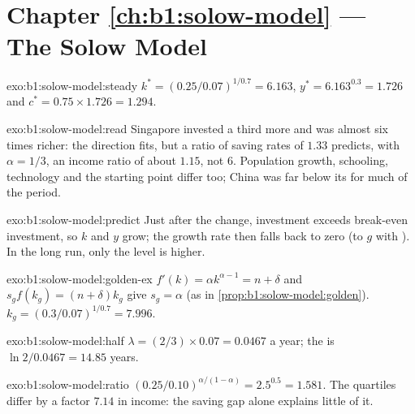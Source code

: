 \section*{Chapter \ref{ch:b1:solow-model} --- The Solow Model}

\begin{solution}{exo:b1:solow-model:steady}
$k^* = (0.25/0.07)^{1/0.7} = 6.163$, $y^* = 6.163^{0.3} = 1.726$ and $c^* = 0.75 \times 1.726 = 1.294$.
\end{solution}

\begin{solution}{exo:b1:solow-model:read}
Singapore invested a third more and was almost six times richer: the
direction fits, but a ratio of saving rates of $1.33$ predicts, with $\alpha = 1/3$, an
income ratio of about $1.15$, not 6. Population growth, schooling, technology
and the starting point differ too; China was far below its 
for much of the period.
\end{solution}

\begin{solution}{exo:b1:solow-model:predict}
Just after the change, investment exceeds break-even investment, so $k$ and
$y$ grow; the growth rate then falls back to zero (to $g$ with ). In the long run, only the level is higher.
\end{solution}

\begin{solution}{exo:b1:solow-model:golden-ex}
$f'(k) = \alpha k^{\alpha - 1} = n + \delta$ and $s_g f(k_g) = (n + \delta)k_g$ give $s_g = \alpha$ (as in
\cref{prop:b1:solow-model:golden}). $k_g = (0.3/0.07)^{1/0.7} = 7.996$.
\end{solution}

\begin{solution}{exo:b1:solow-model:half}
$\lambda = (2/3) \times 0.07 = 0.0467$ a year; the  is $\ln 2/0.0467 = 14.85$ years.
\end{solution}

\begin{solution}{exo:b1:solow-model:ratio}
$(0.25/0.10)^{\alpha/(1 - \alpha)} = 2.5^{0.5} = 1.581$. The quartiles differ by a factor $7.14$ in
income: the saving gap alone explains little of it.
\end{solution}

